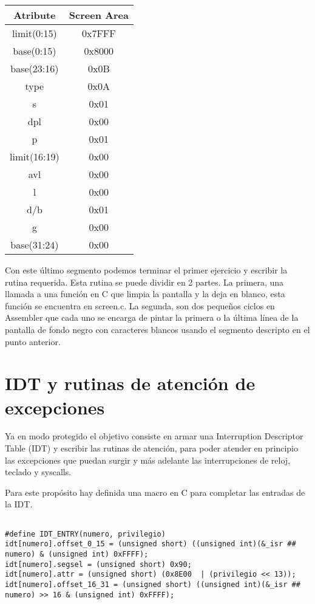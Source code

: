 \documentclass[10pt, a4paper]{article}
\begin{document}
\begin{center}
\begin{tabular}{| c || c |}
	\hline
		Atribute & Screen Area\\
	\hline
		limit(0:15) & 0x7FFF\\
		base(0:15) & 0x8000 \\
		base(23:16) & 0x0B \\
		type & 0x0A \\
		s & 0x01 \\
		dpl & 0x00\\
		p & 0x01 \\
		limit(16:19) & 0x00\\
		avl & 0x00\\
		l & 0x00\\
		d/b & 0x01\\
		g & 0x00\\
		base(31:24) & 0x00\\
	\hline

\end{tabular}
\end{center}

Con este \'ultimo segmento podemos terminar el primer ejercicio y escribir la rutina requerida. Esta rutina se
puede dividir en 2 partes. La primera, una llamada a una funci\'on en C que limpia la pantalla y la deja en
blanco, esta funci\'on se encuentra en screen.c. La segunda, son dos peque\~nos ciclos en Assembler que cada uno
se encarga de pintar la primera o la \'ultima l\'inea de la pantalla de fondo negro con caracteres blancos usando el
segmento descripto en el punto anterior.


\section{IDT y rutinas de atenci\'on de excepciones}

Ya en modo protegido el objetivo consiste en armar una Interruption Descriptor Table (IDT) y escribir las rutinas de atenci\'on,
para poder atender en principio las excepciones que puedan surgir y m\'as adelante las interrupciones de reloj, teclado y syscalls.

Para este prop\'osito hay definida una macro en C para completar las entradas de la IDT.

\begin{footnotesize}
\begin{lstlisting}

#define IDT_ENTRY(numero, privilegio)
idt[numero].offset_0_15 = (unsigned short) ((unsigned int)(&_isr ## numero) & (unsigned int) 0xFFFF);
idt[numero].segsel = (unsigned short) 0x90;
idt[numero].attr = (unsigned short) (0x8E00  | (privilegio << 13));
idt[numero].offset_16_31 = (unsigned short) ((unsigned int)(&_isr ## numero) >> 16 & (unsigned int) 0xFFFF);

\end{lstlisting}
\end{footnotesize}
\end{document}
